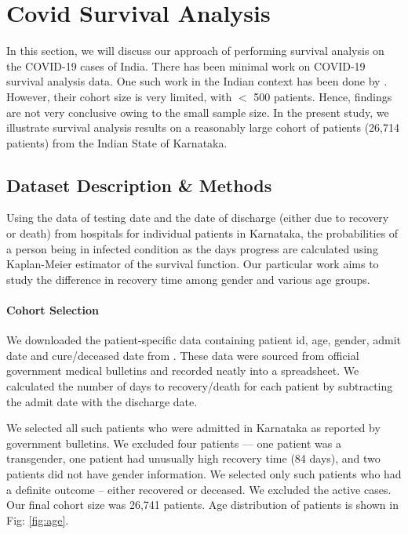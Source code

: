 \documentclass[letterpaper]{article} %
\begin{document}
	\section{Covid Survival Analysis}\label{surv}
	
	
	In this section, we will discuss our approach of performing survival analysis \cite{pocock2002survival} on the COVID-19 cases of India.  There has been minimal work on COVID-19 survival analysis data. One such work in the Indian context has been done by \citet{mishra2020covid}. However, their cohort size is very limited, with $<$ 500 patients. Hence, findings are  not very conclusive owing to the small sample size. 	In the present study, we illustrate survival analysis results on a reasonably large cohort of patients (26,714 patients) from the Indian State of Karnataka.
	
	
	
	
	\subsection{Dataset Description \& Methods}
	
	Using the data of testing date and the date of discharge (either due to recovery or death) from  hospitals for individual patients in Karnataka, the probabilities of a person being in infected condition as the days progress are calculated using Kaplan-Meier estimator of the survival function. Our particular work aims to study the difference in recovery time among gender and various age groups. 
	\paragraph{Cohort Selection}
	
	
	We downloaded the patient-specific data containing patient id, age, gender,  admit date and cure/deceased date from \citet{AGM-2020}. These data were sourced from official government medical bulletins and recorded neatly into a spreadsheet. 
	We calculated the number of days to recovery/death for each patient by subtracting the admit date with the discharge date.  
	
	
	We selected all such patients who were admitted in Karnataka as reported by government bulletins. We excluded four patients --- one patient was a transgender, one patient had unusually high recovery time (84 days), and two patients did not have gender information. We selected only such patients who had a definite outcome -- either recovered or deceased. We excluded the active cases. Our final cohort size was 26,741 patients. Age distribution of patients is shown in Fig: \ref{fig:age}. 
	
\end{document}
